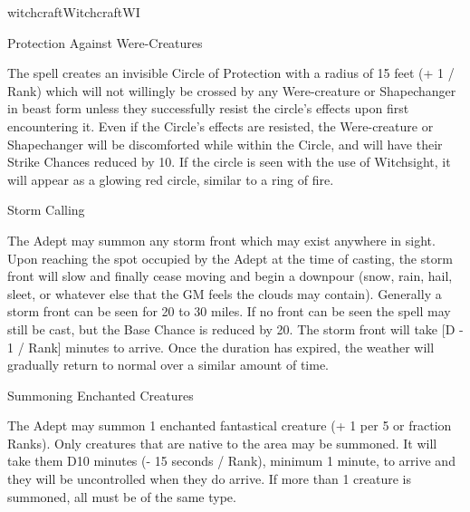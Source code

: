 \begin{college}[1.1]{witchcraft}{Witchcraft}{WI}
\begin{spell}[G-9]{Protection Against Were-Creatures}
\begin{effects}
The spell creates an invisible Circle of Protection with a radius of
15 feet (+ 1 / Rank) which will not willingly be crossed by any
Were-creature or Shapechanger in beast form unless they successfully
resist the circle's effects upon first encountering it.  Even if the
Circle's effects are resisted, the Were-creature or Shapechanger will
be discomforted while within the Circle, and will have their Strike
Chances reduced by 10.  If the circle is seen with the use of
Witchsight, it will appear as a glowing red circle, similar to a ring
of fire.
\end{effects}
\end{spell}

\begin{spell}[G-10]{Storm Calling}

\begin{effects}
The Adept may summon any storm front which may exist anywhere in
sight.  Upon reaching the spot occupied by the Adept at the time of
casting, the storm front will slow and finally cease moving and begin
a downpour (snow, rain, hail, sleet, or whatever else that the GM
feels the clouds may contain). Generally a storm front can be seen for
20 to 30 miles.  If no front can be seen the spell may still be cast,
but the Base Chance is reduced by 20.  The storm front will take [D  - 1 / Rank] minutes to arrive.  Once the duration has expired, the
weather will gradually return to normal over a similar amount of time.
\end{effects}
\end{spell}

\begin{spell}[G-11]{Summoning Enchanted Creatures}

\begin{effects}
The Adept may summon 1 enchanted fantastical creature (+ 1 per 5 or
fraction Ranks).  Only creatures that are native to the area may be
summoned.  It will take them D10 minutes (- 15 seconds / Rank), minimum
1 minute, to arrive and they will be uncontrolled when they do arrive.
If more than 1 creature is summoned, all must be of the same type.
\end{effects}
\end{spell}


\end{college}

